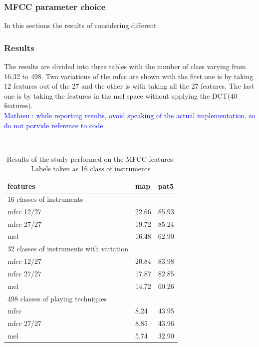\documentclass[hidelinks,12pt]{report}
\newcommand{\ml}[1]{\textcolor{blue}{ Mathieu : #1}}
\begin{document}
\subsubsection{MFCC parameter choice}
In this sections the results of considering different
\subsubsection{Results}
The results are divided into three tables with the number of class varying from 16,32 to 498. Two variations of the mfcc are shown with the first one is by taking 12 features out of the 27 and the other is with taking all the 27 features. The last one is by taking the features in the mel space without applying the DCT(40 features).\\

\ml{while reporting results, avoid speaking of the actual implementation, so do not porvide reference to code}

\begin{table} [H]
\begin{center} 
\ 
 \setlength{\tabcolsep}{.16667em} 
\begin{tabular}{ | l | l | l | }
\hline 
features & map & pat5 \\
\hline
\hline
16 classes of instruments    \\ 
\hline 
mfcc 12/27  & 22.66 & 85.93  \\ 

mfcc 27/27  & 19.72 & 85.24  \\ 

mel &  16.48 & 62.90 \\

 \hline 32 classes of instruments with variation  \\ \hline
mfcc 12/27  & 20.84 & 83.98  \\ 
 
mfcc 27/27 & 17.87 & 82.85  \\ 

mel  & 14.72 & 60.26  \\ \hline

498 classes of playing techniques   \\ \hline

mfcc  & 8.24 & 43.95 \\ 

mfcc 27/27  & 8.85 & 43.96 \\
mel  & 5.74 & 32.90  \\ \hline
\end{tabular} 
\end{center} 
\caption{Results of the study performed on the MFCC features. Labels taken as 16 class of instruments} 
\label{you} 
\end{table} 
\end{document}
